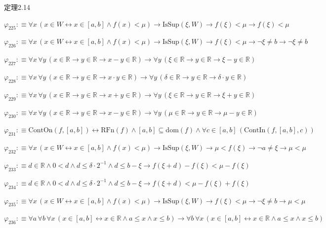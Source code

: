 \begin{fullproof}{定理2.14}
\begin{abbrevlist}
\item $\varphi_{225} :\equiv \forall x\,(x \in W \leftrightarrow x \in [a,b] \land f(x) < \mu) \to \mathrm{IsSup}(\xi,W) \to f(\xi) < \mu \to f(\xi) < \mu$
\item $\varphi_{226} :\equiv \forall x\,(x \in W \leftrightarrow x \in [a,b] \land f(x) < \mu) \to \mathrm{IsSup}(\xi,W) \to f(\xi) < \mu \to \neg \xi \neq b \to \neg \xi \neq b$
\item $\varphi_{227} :\equiv \forall x\,\forall y\,(x \in \mathbb{R} \to y \in \mathbb{R} \to x - y \in \mathbb{R}) \to \forall y\,(\xi \in \mathbb{R} \to y \in \mathbb{R} \to \xi - y \in \mathbb{R})$
\item $\varphi_{228} :\equiv \forall x\,\forall y\,(x \in \mathbb{R} \to y \in \mathbb{R} \to x \cdot y \in \mathbb{R}) \to \forall y\,(\delta \in \mathbb{R} \to y \in \mathbb{R} \to \delta \cdot y \in \mathbb{R})$
\item $\varphi_{229} :\equiv \forall x\,\forall y\,(x \in \mathbb{R} \to y \in \mathbb{R} \to x + y \in \mathbb{R}) \to \forall y\,(\xi \in \mathbb{R} \to y \in \mathbb{R} \to \xi + y \in \mathbb{R})$
\item $\varphi_{230} :\equiv \forall x\,\forall y\,(x \in \mathbb{R} \to y \in \mathbb{R} \to x - y \in \mathbb{R}) \to \forall y\,(\mu \in \mathbb{R} \to y \in \mathbb{R} \to \mu - y \in \mathbb{R})$
\item $\varphi_{231} :\equiv \mathrm{ContOn}(f,[a,b]) \leftrightarrow \mathrm{RFn}(f) \land [a,b] \subseteq \mathrm{dom}(f) \land \forall c \in [a,b]\,(\mathrm{ContIn}(f,[a,b],c))$
\item $\varphi_{232} :\equiv \forall x\,(x \in W \leftrightarrow x \in [a,b] \land f(x) < \mu) \to \mathrm{IsSup}(\xi,W) \to \mu < f(\xi) \to \neg a \neq \xi \to \mu < \mu$
\item $\varphi_{233} :\equiv d \in \mathbb{R} \land 0 < d \land d \leq \delta \cdot 2^{-1} \land d \leq b - \xi \to f(\xi + d) - f(\xi) < \mu - f(\xi)$
\item $\varphi_{234} :\equiv d \in \mathbb{R} \land 0 < d \land d \leq \delta \cdot 2^{-1} \land d \leq b - \xi \to f(\xi + d) < \mu - f(\xi) + f(\xi)$
\item $\varphi_{235} :\equiv \forall x\,(x \in W \leftrightarrow x \in [a,b] \land f(x) < \mu) \to \mathrm{IsSup}(\xi,W) \to f(\xi) < \mu \to \neg \xi \neq b \to \mu < \mu$
\item $\varphi_{236} :\equiv \forall a\,\forall b\,\forall x\,(x \in [a,b] \leftrightarrow x \in \mathbb{R} \land a \leq x \land x \leq b) \to \forall b\,\forall x\,(x \in [a,b] \leftrightarrow x \in \mathbb{R} \land a \leq x \land x \leq b)$

\end{abbrevlist}
\end{fullproof}
